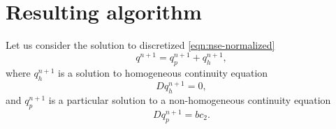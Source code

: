 \documentclass{article}
\numberwithin{equation}{section}
\begin{document}
\section{Resulting algorithm}\label{sec:algorithm}

Let us consider the solution to discretized \cref{eqn:nse-normalized}
\begin{equation*}
	q^{n+1}=q^{n+1}_p+q^{n+1}_h,
\end{equation*}
where $q^{n+1}_h$ is a solution to homogeneous continuity equation 
\begin{equation}\label{eqn:discrete-homogeneous-continuity}
	Dq^{n+1}_h=0,
\end{equation}
and $q^{n+1}_p$ is a particular solution to a non-homogeneous continuity equation
\begin{equation}\label{eqn:discrete-non-homogeneous-continuity}
	Dq^{n+1}_p=bc_2.
\end{equation}

\end{document}
